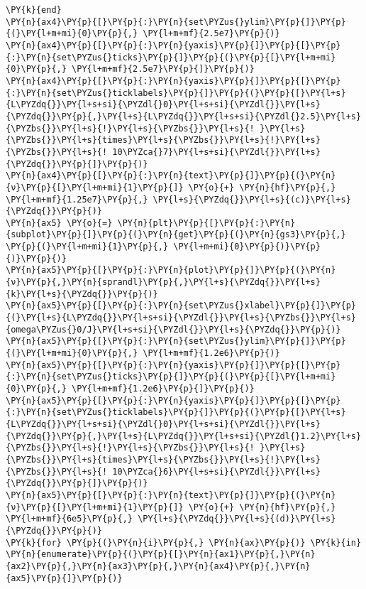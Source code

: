 \begin{Verbatim}[commandchars=\\\{\}]
\PY{k}{end}
\PY{n}{ax4}\PY{p}{[}\PY{p}{:}\PY{n}{set\PYZus{}ylim}\PY{p}{]}\PY{p}{(}\PY{l+m+mi}{0}\PY{p}{,} \PY{l+m+mf}{2.5e7}\PY{p}{)}
\PY{n}{ax4}\PY{p}{[}\PY{p}{:}\PY{n}{yaxis}\PY{p}{]}\PY{p}{[}\PY{p}{:}\PY{n}{set\PYZus{}ticks}\PY{p}{]}\PY{p}{(}\PY{p}{[}\PY{l+m+mi}{0}\PY{p}{,} \PY{l+m+mf}{2.5e7}\PY{p}{]}\PY{p}{)}
\PY{n}{ax4}\PY{p}{[}\PY{p}{:}\PY{n}{yaxis}\PY{p}{]}\PY{p}{[}\PY{p}{:}\PY{n}{set\PYZus{}ticklabels}\PY{p}{]}\PY{p}{(}\PY{p}{[}\PY{l+s}{L\PYZdq{}}\PY{l+s+si}{\PYZdl{}0}\PY{l+s+si}{\PYZdl{}}\PY{l+s}{\PYZdq{}}\PY{p}{,}\PY{l+s}{L\PYZdq{}}\PY{l+s+si}{\PYZdl{}2.5}\PY{l+s}{\PYZbs{}}\PY{l+s}{!}\PY{l+s}{\PYZbs{}}\PY{l+s}{! }\PY{l+s}{\PYZbs{}}\PY{l+s}{times}\PY{l+s}{\PYZbs{}}\PY{l+s}{!}\PY{l+s}{\PYZbs{}}\PY{l+s}{! 10\PYZca{}7}\PY{l+s+si}{\PYZdl{}}\PY{l+s}{\PYZdq{}}\PY{p}{]}\PY{p}{)}
\PY{n}{ax4}\PY{p}{[}\PY{p}{:}\PY{n}{text}\PY{p}{]}\PY{p}{(}\PY{n}{ν}\PY{p}{[}\PY{l+m+mi}{1}\PY{p}{]} \PY{o}{+} \PY{n}{hf}\PY{p}{,} \PY{l+m+mf}{1.25e7}\PY{p}{,} \PY{l+s}{\PYZdq{}}\PY{l+s}{(c)}\PY{l+s}{\PYZdq{}}\PY{p}{)}
\PY{n}{ax5} \PY{o}{=} \PY{n}{plt}\PY{p}{[}\PY{p}{:}\PY{n}{subplot}\PY{p}{]}\PY{p}{(}\PY{n}{get}\PY{p}{(}\PY{n}{gs3}\PY{p}{,} \PY{p}{(}\PY{l+m+mi}{1}\PY{p}{,} \PY{l+m+mi}{0}\PY{p}{)}\PY{p}{)}\PY{p}{)}
\PY{n}{ax5}\PY{p}{[}\PY{p}{:}\PY{n}{plot}\PY{p}{]}\PY{p}{(}\PY{n}{ν}\PY{p}{,}\PY{n}{sprandl}\PY{p}{,}\PY{l+s}{\PYZdq{}}\PY{l+s}{k}\PY{l+s}{\PYZdq{}}\PY{p}{)}
\PY{n}{ax5}\PY{p}{[}\PY{p}{:}\PY{n}{set\PYZus{}xlabel}\PY{p}{]}\PY{p}{(}\PY{l+s}{L\PYZdq{}}\PY{l+s+si}{\PYZdl{}}\PY{l+s}{\PYZbs{}}\PY{l+s}{omega\PYZus{}0/J}\PY{l+s+si}{\PYZdl{}}\PY{l+s}{\PYZdq{}}\PY{p}{)}
\PY{n}{ax5}\PY{p}{[}\PY{p}{:}\PY{n}{set\PYZus{}ylim}\PY{p}{]}\PY{p}{(}\PY{l+m+mi}{0}\PY{p}{,} \PY{l+m+mf}{1.2e6}\PY{p}{)}
\PY{n}{ax5}\PY{p}{[}\PY{p}{:}\PY{n}{yaxis}\PY{p}{]}\PY{p}{[}\PY{p}{:}\PY{n}{set\PYZus{}ticks}\PY{p}{]}\PY{p}{(}\PY{p}{[}\PY{l+m+mi}{0}\PY{p}{,} \PY{l+m+mf}{1.2e6}\PY{p}{]}\PY{p}{)}
\PY{n}{ax5}\PY{p}{[}\PY{p}{:}\PY{n}{yaxis}\PY{p}{]}\PY{p}{[}\PY{p}{:}\PY{n}{set\PYZus{}ticklabels}\PY{p}{]}\PY{p}{(}\PY{p}{[}\PY{l+s}{L\PYZdq{}}\PY{l+s+si}{\PYZdl{}0}\PY{l+s+si}{\PYZdl{}}\PY{l+s}{\PYZdq{}}\PY{p}{,}\PY{l+s}{L\PYZdq{}}\PY{l+s+si}{\PYZdl{}1.2}\PY{l+s}{\PYZbs{}}\PY{l+s}{!}\PY{l+s}{\PYZbs{}}\PY{l+s}{! }\PY{l+s}{\PYZbs{}}\PY{l+s}{times}\PY{l+s}{\PYZbs{}}\PY{l+s}{!}\PY{l+s}{\PYZbs{}}\PY{l+s}{! 10\PYZca{}6}\PY{l+s+si}{\PYZdl{}}\PY{l+s}{\PYZdq{}}\PY{p}{]}\PY{p}{)}
\PY{n}{ax5}\PY{p}{[}\PY{p}{:}\PY{n}{text}\PY{p}{]}\PY{p}{(}\PY{n}{ν}\PY{p}{[}\PY{l+m+mi}{1}\PY{p}{]} \PY{o}{+} \PY{n}{hf}\PY{p}{,} \PY{l+m+mf}{6e5}\PY{p}{,} \PY{l+s}{\PYZdq{}}\PY{l+s}{(d)}\PY{l+s}{\PYZdq{}}\PY{p}{)}
\PY{k}{for} \PY{p}{(}\PY{n}{i}\PY{p}{,} \PY{n}{ax}\PY{p}{)} \PY{k}{in} \PY{n}{enumerate}\PY{p}{(}\PY{p}{[}\PY{n}{ax1}\PY{p}{,}\PY{n}{ax2}\PY{p}{,}\PY{n}{ax3}\PY{p}{,}\PY{n}{ax4}\PY{p}{,}\PY{n}{ax5}\PY{p}{]}\PY{p}{)}

\end{Verbatim}
